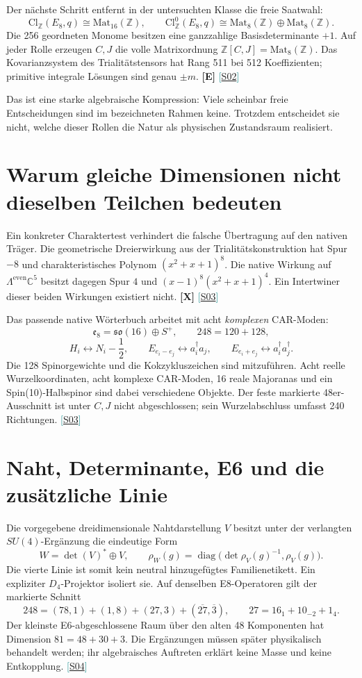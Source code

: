 \documentclass[11pt,a4paper,oneside,parskip=half,headings=normal,numbers=noenddot,bibliography=totoc]{scrreprt}
\newcommand{\C}{\mathbb C}
\newcommand{\Z}{\mathbb Z}
\newcommand{\src}[1]{\textcolor{teal}{\small[\hyperref[s:#1]{S#1}]}}
\newcommand{\st}[1]{\textsf{\textbf{[#1]}}}
\begin{document}
Der nächste Schritt entfernt in der untersuchten Klasse die freie Saatwahl:
\[
 \mathrm{Cl}_{\Z}(E_8,q)\cong\mathrm{Mat}_{16}(\Z),\qquad
 \mathrm{Cl}_{\Z}^{0}(E_8,q)\cong
 \mathrm{Mat}_8(\Z)\oplus\mathrm{Mat}_8(\Z).
\]
Die 256 geordneten Monome besitzen eine ganzzahlige Basisdeterminante $+1$. Auf jeder Rolle erzeugen $C,J$ die volle Matrixordnung $\Z[C,J]=\mathrm{Mat}_8(\Z)$. Das Kovarianzsystem des Trialitätstensors hat Rang 511 bei 512 Koeffizienten; primitive integrale Lösungen sind genau $\pm m$. \st{E} \src{02}

Das ist eine starke algebraische Kompression: Viele scheinbar freie Entscheidungen sind im bezeichneten Rahmen keine. Trotzdem entscheidet sie nicht, welche dieser Rollen die Natur als physischen Zustandsraum realisiert.

\section{Warum gleiche Dimensionen nicht dieselben Teilchen bedeuten}
Ein konkreter Charaktertest verhindert die falsche Übertragung auf den nativen Träger. Die geometrische Dreierwirkung aus der Trialitätskonstruktion hat Spur $-8$ und charakteristisches Polynom $(x^2+x+1)^8$. Die native Wirkung auf $\Lambda^{\mathrm{even}}\C^5$ besitzt dagegen Spur $4$ und $(x-1)^8(x^2+x+1)^4$. Ein Intertwiner dieser beiden Wirkungen existiert nicht. \st{X} \src{03}

Das passende native Wörterbuch arbeitet mit acht \emph{komplexen} CAR-Moden:
\[
 \mathfrak e_8=\mathfrak{so}(16)\oplus S^+,
 \qquad248=120+128,
\]
\[
 H_i\leftrightarrow N_i-\frac12,\qquad
 E_{e_i-e_j}\leftrightarrow a_i^\dagger a_j,\qquad
 E_{e_i+e_j}\leftrightarrow a_i^\dagger a_j^\dagger.
\]
Die 128 Spinorgewichte und die Kokzykluszeichen sind mitzuführen. Acht reelle Wurzelkoordinaten, acht komplexe CAR-Moden, 16 reale Majoranas und ein Spin(10)-Halbspinor sind dabei verschiedene Objekte. Der feste markierte 48er-Ausschnitt ist unter $C,J$ nicht abgeschlossen; sein Wurzelabschluss umfasst 240 Richtungen. \src{03}

\section{Naht, Determinante, E6 und die zusätzliche Linie}
Die vorgegebene dreidimensionale Nahtdarstellung $V$ besitzt unter der verlangten $SU(4)$-Ergänzung die eindeutige Form
\[
 W=\det(V)^*\oplus V,\qquad
 \rho_W(g)=\operatorname{diag}\bigl(\det\rho_V(g)^{-1},\rho_V(g)\bigr).
\]
Die vierte Linie ist somit kein neutral hinzugefügtes Familienetikett. Ein expliziter $D_4$-Projektor isoliert sie. Auf denselben E8-Operatoren gilt der markierte Schnitt
\[
 248=(78,1)+(1,8)+(27,3)+(\overline{27},\overline3),\qquad
 27=16_1+10_{-2}+1_4.
\]
Der kleinste E6-abgeschlossene Raum über den alten 48 Komponenten hat Dimension $81=48+30+3$. Die Ergänzungen müssen später physikalisch behandelt werden; ihr algebraisches Auftreten erklärt keine Masse und keine Entkopplung. \src{04}
\end{document}
